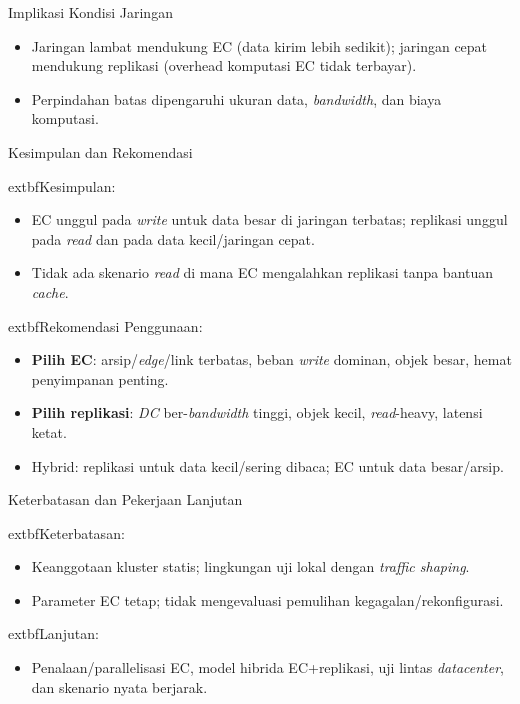 \documentclass[a2,portrait]{config/poster/a0poster}
\newcommand{\postersection}[1]{%
	\begin{tcolorbox}[
		colback=ITBblue,
		colframe=ITBblue,
		fonttitle=\bfseries,
		coltext=white,
		sharp corners,
		boxrule=0pt,
		top=0pt,
		bottom=0pt,
		halign=center
	]
	\normalsize #1
	\end{tcolorbox}%
}
\begin{document}
\begin{multicols}{2}

\postersection{Implikasi Kondisi Jaringan}
\begin{itemize}[leftmargin=*, itemsep=2pt]
	\item Jaringan lambat mendukung EC (data kirim lebih sedikit); jaringan cepat mendukung replikasi (overhead komputasi EC tidak terbayar).
	\item Perpindahan batas dipengaruhi ukuran data, \textit{bandwidth}, dan biaya komputasi.
\end{itemize}


\postersection{Kesimpulan dan Rekomendasi}
	extbf{Kesimpulan:}
\begin{itemize}[leftmargin=*, itemsep=2pt]
	\item EC unggul pada \textit{write} untuk data besar di jaringan terbatas; replikasi unggul pada \textit{read} dan pada data kecil/jaringan cepat.
	\item Tidak ada skenario \textit{read} di mana EC mengalahkan replikasi tanpa bantuan \textit{cache}.
\end{itemize}
		extbf{Rekomendasi Penggunaan:}
\begin{itemize}[leftmargin=*, itemsep=2pt]
	\item \textbf{Pilih EC}: arsip/\textit{edge}/link terbatas, beban \textit{write} dominan, objek besar, hemat penyimpanan penting.
	\item \textbf{Pilih replikasi}: \textit{DC} ber-\textit{bandwidth} tinggi, objek kecil, \textit{read}-heavy, latensi ketat.
	\item Hybrid: replikasi untuk data kecil/sering dibaca; EC untuk data besar/arsip.
\end{itemize}


\postersection{Keterbatasan dan Pekerjaan Lanjutan}
	extbf{Keterbatasan:}
\begin{itemize}[leftmargin=*, itemsep=2pt]
	\item Keanggotaan kluster statis; lingkungan uji lokal dengan \textit{traffic shaping}.
	\item Parameter EC tetap; tidak mengevaluasi pemulihan kegagalan/rekonfigurasi.
\end{itemize}
		extbf{Lanjutan:}
\begin{itemize}[leftmargin=*, itemsep=2pt]
	\item Penalaan/parallelisasi EC, model hibrida EC+replikasi, uji lintas \textit{datacenter}, dan skenario nyata berjarak.
\end{itemize}


\end{multicols}
\end{document}
